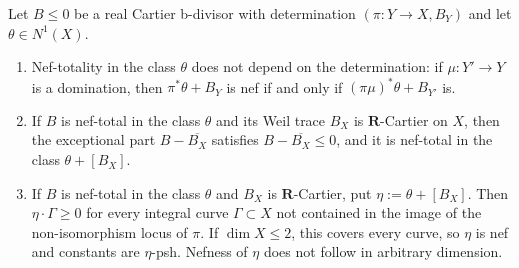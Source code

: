 \begin{lemma}
\label{lem:ch38-nef-total-intrinsic}
Let $B\leq0$ be a real Cartier b-divisor with determination
$(\pi:Y\to X,B_Y)$ and let $\theta\in N^1(X)$.
\begin{enumerate}
\item\label{itm:ch38-nt:indep} Nef-totality in the class $\theta$ does
 not depend on the determination: if $\mu:Y'\to Y$ is a domination, then
 $\pi^*\theta+B_Y$ is nef if and only if
 $(\pi\mu)^*\theta+B_{Y'}$ is.
\item\label{itm:ch38-nt:exceptional} If $B$ is nef-total in the class
 $\theta$ and its Weil trace $B_X$ is $\mathbf R$-Cartier on $X$,
 then the exceptional part $B-\overline{B_X}$ satisfies
 $B-\overline{B_X}\leq0$, and it is nef-total in the class
 $\theta+[B_X]$.
\item\label{itm:ch38-nt:trace} If $B$ is nef-total in the class
 $\theta$ and $B_X$ is $\mathbf R$-Cartier, put
 $\eta:=\theta+[B_X]$. Then $\eta\cdot\Gamma\geq0$ for every
 integral curve $\Gamma\subset X$ not contained in the image of
 the non-isomorphism locus of $\pi$. If $\dim X\leq2$, this covers
 every curve, so $\eta$ is nef and constants are $\eta$-psh.
 Nefness of $\eta$ does not follow in arbitrary dimension.
\end{enumerate}
\end{lemma}

